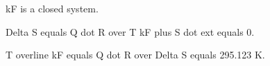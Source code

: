 kF is a closed system.

Delta S equals Q dot R over T kF plus S dot ext equals 0.

T overline kF equals Q dot R over Delta S equals 295.123 K.